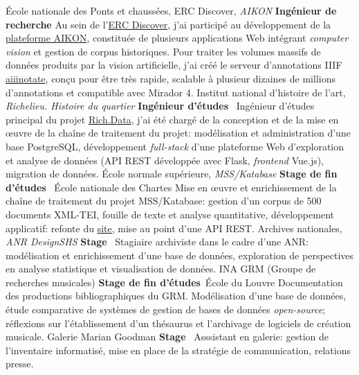 	{%
		École nationale des Ponts et chaussées, ERC Discover, \textit{AIKON}
	}
	{%
		\textbf{Ingénieur de recherche}
	}
	{%
		Au sein de l'\href{https://erc-discover.github.io/}{ERC Discover}, j'ai participé au développement de la \href{https://aikon-platform.github.io/}{plateforme AIKON}, constituée de plusieurs applications Web intégrant \textit{computer vision} et gestion de corpus historiques. Pour traiter les volumes massifs de données produits par la vision artificielle, j'ai créé le serveur d'annotations IIIF \href{https://github.com/Aikon-platform/aiiinotate/tree/main}{aiiinotate}, conçu pour être très rapide, scalable à plusieur dizaines de millions d'annotations et compatible avec Mirador 4.
	}
	{%
		Institut national d'histoire de l'art, \textit{Richelieu. Histoire du quartier}}
	{%
		\textbf{Ingénieur d'études}~}
	{%
		Ingénieur d'études principal du projet \href{https://quartier-richelieu.inha.fr/}{Rich.Data}, j'ai été chargé de la conception et de la mise en \oe{}uvre de la chaîne de traitement du projet: modélisation et administration d'une base PostgreSQL, développement \textit{full-stack} d'une plateforme Web d'exploration et analyse de données (API REST développée avec Flask, \textit{frontend} Vue.js), migration de données.}
	{%
		École normale supérieure, \textit{MSS/Katabase}}
	{%
		\textbf{Stage de fin d'études}~ École nationale des Chartes}
	{%
		Mise en \oe{}uvre et enrichissement de la chaîne de traitement du projet MSS/Katabase: gestion d'un corpus de 500 documents XML-TEI, fouille de texte et analyse quantitative, développement applicatif: refonte du \href{https://katabase.huma-num.fr/}{site}, mise au point d'une API REST.}
	{%
		Archives nationales, \textit{ANR DesignSHS}}
	{%
		\textbf{Stage}~}
	{%
		Stagiaire archiviste dans le cadre d’une ANR: modélisation et enrichissement d'une base
		de données, exploration de perspectives en analyse statistique et visualisation de données.}
	{%
		INA GRM (Groupe de recherches musicales)}
	{%
		\textbf{Stage de fin d'études}~École du Louvre}
	{%
		Documentation des productions bibliographiques du GRM. Modélisation d'une base de données, étude comparative de systèmes de gestion de bases de données \textit{open-source}; réflexions sur l'établissement d’un thésaurus et l'archivage de logiciels de création musicale.}
	{%
		Galerie Marian Goodman}
	{%
		\textbf{Stage}~}
	{%
		Asssistant en galerie: gestion de l'inventaire informatisé, mise en place de la stratégie de communication, relations presse.}
